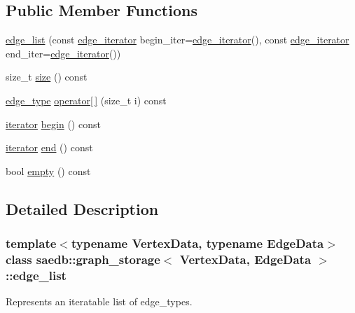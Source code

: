 \subsection*{Public Member Functions}
\begin{DoxyCompactItemize}
\item 
\hyperlink{classsaedb_1_1graph__storage_1_1edge__list_abc51f0c12f89fc45bee806fdb0a23e16}{edge\-\_\-list} (const \hyperlink{classsaedb_1_1graph__storage_1_1edge__iterator}{edge\-\_\-iterator} begin\-\_\-iter=\hyperlink{classsaedb_1_1graph__storage_1_1edge__iterator}{edge\-\_\-iterator}(), const \hyperlink{classsaedb_1_1graph__storage_1_1edge__iterator}{edge\-\_\-iterator} end\-\_\-iter=\hyperlink{classsaedb_1_1graph__storage_1_1edge__iterator}{edge\-\_\-iterator}())
\item 
size\-\_\-t \hyperlink{classsaedb_1_1graph__storage_1_1edge__list_af701a138d082e5f07f65fe42e2b62203}{size} () const 
\item 
\hyperlink{classsaedb_1_1graph__storage_1_1edge__type}{edge\-\_\-type} \hyperlink{classsaedb_1_1graph__storage_1_1edge__list_a10f8b249b0d49f01f27efe9462dd57f6}{operator\mbox{[}$\,$\mbox{]}} (size\-\_\-t i) const 
\item 
\hyperlink{classsaedb_1_1graph__storage_1_1edge__list_ad2b3368008717c7522cdc2b461e7d35a}{iterator} \hyperlink{classsaedb_1_1graph__storage_1_1edge__list_a2908c626481d3971b7ef998523cee4ce}{begin} () const 
\item 
\hyperlink{classsaedb_1_1graph__storage_1_1edge__list_ad2b3368008717c7522cdc2b461e7d35a}{iterator} \hyperlink{classsaedb_1_1graph__storage_1_1edge__list_a4b7f4fa4d6cc62605d77ca5d8ec02459}{end} () const 
\item 
bool \hyperlink{classsaedb_1_1graph__storage_1_1edge__list_a0f8657d1648c8b355c29a60d27bd755f}{empty} () const 
\end{DoxyCompactItemize}


\subsection{Detailed Description}
\subsubsection*{template$<$typename Vertex\-Data, typename Edge\-Data$>$class saedb\-::graph\-\_\-storage$<$ Vertex\-Data, Edge\-Data $>$\-::edge\-\_\-list}

Represents an iteratable list of edge\-\_\-types. 

